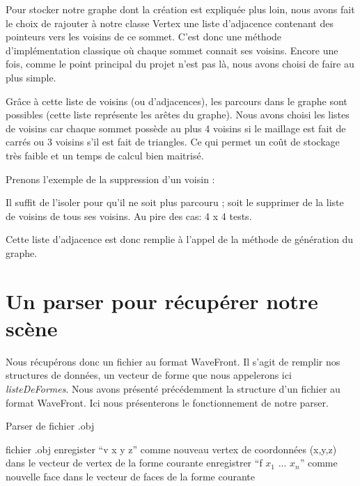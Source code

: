 \documentclass[a4paper,12pt]{report}
\begin{document}
Pour stocker notre graphe dont la création est expliquée plus loin, nous avons fait le choix de rajouter à notre classe Vertex une liste d'adjacence contenant des pointeurs vers les voisins de ce sommet. C'est donc une méthode d'implémentation classique où chaque sommet connait ses voisins. Encore une fois, comme le point principal du projet n'est pas là, nous avons choisi de faire au plus simple. 

Grâce à cette liste de voisins (ou d'adjacences), les parcours dans le graphe sont possibles (cette liste représente les arêtes du graphe). Nous avons choisi les listes de voisins car chaque sommet possède au plus 4 voisins si le maillage est fait de carrés ou 3 voisins s'il est fait de triangles. Ce qui permet un coût de stockage très faible et un temps de calcul bien maitrisé. 

Prenons l'exemple de la suppression d'un voisin :

Il suffit de l'isoler pour qu'il ne soit plus parcouru ; soit le supprimer de la liste de voisins de tous ses voisins. Au pire des cas: 4 x 4 tests.
 
Cette liste d'adjacence est donc remplie à l'appel de la méthode de génération du graphe.

\section{Un parser pour récupérer notre scène}

Nous récupérons donc un fichier au format WaveFront. Il s'agit de remplir nos structures de données, un vecteur de forme que nous appelerons ici \textit{listeDeFormes}.
Nous avons présenté précédemment la structure d'un fichier au format WaveFront. Ici nous présenterons le fonctionnement de notre parser.

\begin{algorithm}[h]
\caption{Parser de fichier .obj}
\label{parser}
\begin{algorithmic}[1]
\REQUIRE fichier .obj
    \STATE enregister ``v x y z'' comme nouveau vertex de coordonnées (x,y,z) dans le vecteur de vertex de la forme courante
  \ELSE
    \STATE enregistrer ``f $x_{1}$ ... $x_{n}$'' comme nouvelle face dans le vecteur de faces de la forme courante
    \ENDIF
  \ENDIF
\ENDFOR
\end{algorithmic}
\end{algorithm}
\end{document}
